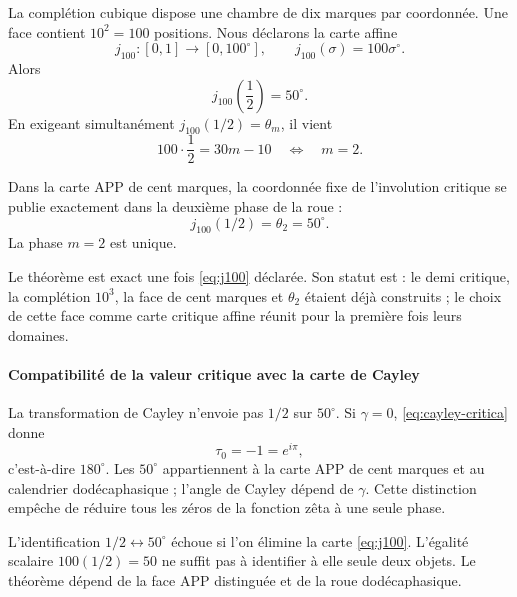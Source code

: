 La complétion cubique dispose une chambre de dix marques par coordonnée. Une
face contient \(10^2=100\) positions. Nous déclarons la carte affine
\begin{equation}
j_{100}:[0,1]\longrightarrow[0,100^\circ],
\qquad j_{100}(\sigma)=100\sigma^\circ.
\label{eq:j100}
\end{equation}
Alors
\[
j_{100}\left(\frac12\right)=50^\circ.
\]
En exigeant simultanément \(j_{100}(1/2)=\theta_m\), il vient
\[
100\cdot\frac12=30m-10
\quad\Longleftrightarrow\quad m=2.
\]

\begin{theorem}
Dans la carte APP de cent marques, la coordonnée fixe de l'involution critique
se publie exactement dans la deuxième phase de la roue :
\begin{equation}
\boxed{j_{100}(1/2)=\theta_2=50^\circ.}
\label{eq:igualador-50}
\end{equation}
La phase \(m=2\) est unique.
\end{theorem}

Le théorème est exact une fois \eqref{eq:j100} déclarée. Son statut est
: le demi critique, la complétion \(10^3\), la
face de cent marques et \(\theta_2\) étaient déjà construits ; le choix de cette
face comme carte critique affine réunit pour la première fois leurs domaines.

\paragraph{Compatibilité de la valeur critique avec la carte de Cayley}

La transformation de Cayley n'envoie pas \(1/2\) sur \(50^\circ\). Si
\(\gamma=0\), \eqref{eq:cayley-critica} donne
\[
\tau_0=-1=e^{i\pi},
\]
c'est-à-dire \(180^\circ\). Les \(50^\circ\) appartiennent à la carte APP de cent
marques et au calendrier dodécaphasique ; l'angle de Cayley dépend de \(\gamma\).
Cette distinction empêche de réduire tous les zéros de la fonction zêta à une seule
phase.

\begin{falsifier}
L'identification \(1/2\leftrightarrow50^\circ\) échoue si l'on élimine la
carte \eqref{eq:j100}. L'égalité scalaire \(100(1/2)=50\) ne suffit pas
à identifier à elle seule deux objets. Le théorème dépend de la face APP
distinguée et de la roue dodécaphasique.
\end{falsifier}

